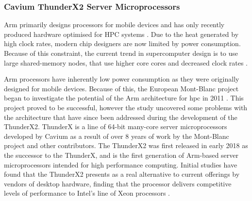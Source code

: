 \documentclass[a4paper,11pt]{report}
\begin{document}


\subsubsection{Cavium ThunderX2 Server Microprocessors}
Arm primarily designs processors for mobile devices and has only recently produced hardware optimised for HPC systems \cite{mcintosh2018performance}. Due to the heat generated by high clock rates, modern chip designers are now limited by power consumption. Because of this constraint, the current trend in supercomputer design is to use large shared-memory nodes, that use higher core cores and decreased clock rates \cite{kindratenko2011trends}. 
\par
Arm processors have inherently low power consumption as they were originally designed for mobile devices. Because of this, the European Mont-Blanc project began to investigate the potential of the Arm architecture for \gls{hpc} in 2011 \cite{Rajovic:2016:MPA:3014904.3014955}. This project proved to be successful, however the study uncovered some problems with the architecture that have since been addressed during the development of the ThunderX2. ThunderX is a line of 64-bit many-core server microprocessors developed by Cavium as a result of over 8 years of work by the Mont-Blanc project and other contributors. The ThunderX2 was first released in early 2018 as the successor to the ThunderX, and is the first generation of Arm-based server microprocessors intended for high performance computing. Initial studies have found that the ThunderX2 presents as a real alternative to current offerings by vendors of desktop hardware, finding that the processor delivers competitive levels of performance to Intel's line of Xeon processors \cite{calore2018advanced, mcintosh2018performance}. 
\par
\end{document}
